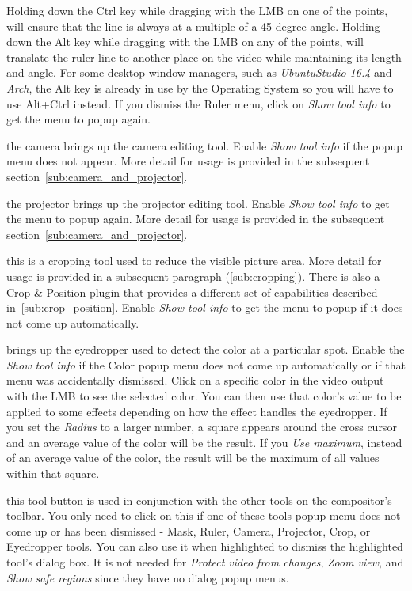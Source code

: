 \begin{description}
Holding down the Ctrl key while dragging with the LMB on one of the points, will
ensure that the line is always at a multiple of a 45 degree angle.  Holding down the Alt key while
dragging with the LMB on any of the points, will translate the ruler line to another place on 
the video while maintaining its length and angle. For some desktop window managers, such as 
\textit{UbuntuStudio 16.4} and \textit{Arch}, the Alt key is already in use by the Operating System
so you will have to use Alt+Ctrl instead.
If you dismiss the Ruler menu, click on
\textit{Show tool info} to get the menu to popup again.  
    \item[Adjust camera automation]  the camera brings up the camera editing tool. Enable \textit{Show tool info} if the popup menu does not appear. More detail for usage is provided in the subsequent
section~\ref{sub:camera_and_projector}.
    \item[Adjust projector automation]  the projector brings up the projector editing tool. Enable \textit{Show tool info} to get the menu to popup again. More detail for usage is provided in the
subsequent section~\ref{sub:camera_and_projector}.
    \item[Crop a layer or output]  this is a cropping tool used to reduce the visible picture area.
More detail for usage is provided in a 
subsequent paragraph (\ref{sub:cropping}).  There is also a Crop \& Position plugin that provides
a different set of capabilities described in~\ref{sub:crop_position}.
    Enable \textit{Show tool info} to get the menu to popup if it does not come
up automatically.
    \item[Get color / eyedropper]  brings up the eyedropper used to detect the color at a
particular spot.  Enable the \textit{Show tool info} if the Color popup menu does not come up 
automatically or if that menu was accidentally dismissed.  Click on a specific color in the video
output with the LMB to see the selected color. You can then use that color's 
value to be applied to some effects depending on how the effect handles the eyedropper.  If you set the \textit{Radius} to a larger number, a square appears
around the cross cursor and an average value of the color will be the result.
If you \textit{Use maximum}, instead of an average value of the color, the result
will be the maximum of all values within that square.
    \item[Show tool info]  this tool button is used in conjunction with the other tools on the
compositor's toolbar. You only need to click on this if one of these tools popup menu does not
come up or has been dismissed - Mask, Ruler, Camera, Projector, Crop, or Eyedropper tools.
You can also use it when highlighted to dismiss the highlighted tool's dialog box.
It is not needed for \textit{Protect video from changes}, \textit{Zoom view}, and \textit{Show safe regions} since they have
no dialog popup menus.


\end{description}
